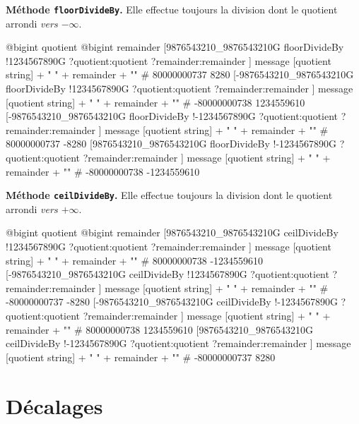\textbf{Méthode \texttt{floorDivideBy}.} Elle effectue toujours la division dont le quotient arrondi \emph{vers $-\infty$}.

\begin{galgas}
  @bigint quotient
  @bigint remainder
  [9876543210_9876543210G floorDivideBy
    !1234567890G
    ?quotient:quotient
    ?remainder:remainder
  ]
  message [quotient string] + " " + remainder + "\n" # 80000000737 8280
  [-9876543210_9876543210G floorDivideBy
    !1234567890G
    ?quotient:quotient
    ?remainder:remainder
  ]
  message [quotient string] + " " + remainder + "\n" # -80000000738 1234559610
  [-9876543210_9876543210G floorDivideBy
    !-1234567890G
    ?quotient:quotient
    ?remainder:remainder
  ]
  message [quotient string] + " " + remainder + "\n" # 80000000737 -8280
  [9876543210_9876543210G floorDivideBy
    !-1234567890G
    ?quotient:quotient
    ?remainder:remainder
  ]
  message [quotient string] + " " + remainder + "\n" # -80000000738 -1234559610
\end{galgas}






\textbf{Méthode \texttt{ceilDivideBy}.} Elle effectue toujours la division dont le quotient arrondi \emph{vers $+\infty$}.

\begin{galgas}
  @bigint quotient
  @bigint remainder
  [9876543210_9876543210G ceilDivideBy
    !1234567890G
    ?quotient:quotient
    ?remainder:remainder
  ]
  message [quotient string] + " " + remainder + "\n" # 80000000738 -1234559610
  [-9876543210_9876543210G ceilDivideBy
    !1234567890G
    ?quotient:quotient
    ?remainder:remainder
  ]
  message [quotient string] + " " + remainder + "\n" # -80000000737 -8280
  [-9876543210_9876543210G ceilDivideBy
    !-1234567890G
    ?quotient:quotient
    ?remainder:remainder
  ]
  message [quotient string] + " " + remainder + "\n" # 80000000738 1234559610
  [9876543210_9876543210G ceilDivideBy
    !-1234567890G
    ?quotient:quotient
    ?remainder:remainder
  ]
  message [quotient string] + " " + remainder + "\n" # -80000000737 8280
\end{galgas}








\section{Décalages}

